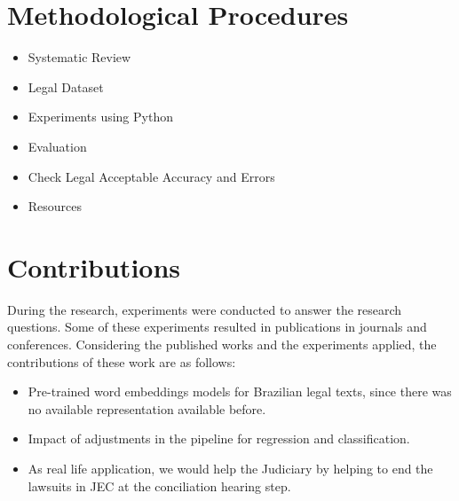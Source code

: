 \section{Methodological Procedures}

\begin{itemize}[noitemsep]
    \item Systematic Review
    \item Legal Dataset 
    \item Experiments using Python
    \item Evaluation
    \item Check Legal Acceptable Accuracy and Errors
    \item Resources
\end{itemize}




\section{Contributions}

During the research, experiments were conducted to answer the research questions. Some of these experiments resulted in publications in journals and conferences. Considering the published works and the experiments applied, the contributions of these work are as follows:

\begin{itemize}[noitemsep]
    \item Pre-trained word embeddings models for Brazilian legal texts, since there was no available representation available before.
    \item Impact of adjustments in the pipeline for regression and classification.
    \item As real life application, we would help the Judiciary by helping to end the lawsuits in JEC at the conciliation hearing step.
\end{itemize}


